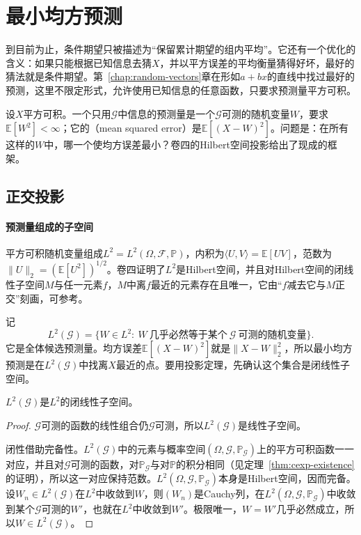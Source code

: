 \section{最小均方预测}
\label{sec:cexp-prediction}

到目前为止，条件期望只被描述为“保留累计期望的组内平均”。它还有一个优化的含义：如果只能根据已知信息去猜$X$，并以平方误差的平均衡量猜得好坏，最好的猜法就是条件期望。第~\ref{chap:random-vectors}章在形如$a+bx$的直线中找过最好的预测，这里不限定形式，允许使用已知信息的任意函数，只要求预测量平方可积。

设$X$平方可积。一个只用$\mathcal{G}$中信息的预测量是一个$\mathcal{G}$可测的随机变量$W$，要求$\mathbb{E}[W^{2}]<\infty$；它的（mean squared error）是$\mathbb{E}[(X-W)^{2}]$。问题是：在所有这样的$W$中，哪一个使均方误差最小？卷四的Hilbert空间投影给出了现成的框架。

\subsection{正交投影}
\label{sec:cexp-projection}

\paragraph{预测量组成的子空间}
平方可积随机变量组成$L^{2}=L^{2}(\Omega,\mathcal{F},\mathbb{P})$，内积为$\langle U,V\rangle=\mathbb{E}[UV]$，范数为$\lVert U\rVert_2=(\mathbb{E}[U^{2}])^{1/2}$。卷四证明了$L^{2}$是Hilbert空间，并且对Hilbert空间的闭线性子空间$M$与任一元素$f$，$M$中离$f$最近的元素存在且唯一，它由“$f$减去它与$M$正交”刻画，可参考。

记
\[
 L^{2}(\mathcal{G})=\bigl\{W\in L^{2}:\ W\ \text{几乎必然等于某个}\ \mathcal{G}\ \text{可测的随机变量}\bigr\}.
\]
它是全体候选预测量。均方误差$\mathbb{E}[(X-W)^{2}]$就是$\lVert X-W\rVert_2^{2}$，所以最小均方预测是在$L^{2}(\mathcal{G})$中找离$X$最近的点。要用投影定理，先确认这个集合是闭线性子空间。

\begin{lemma}[已知信息上的平方可积变量]
\label{lem:cexp-closed-subspace}
$L^{2}(\mathcal{G})$是$L^{2}$的闭线性子空间。
\end{lemma}

\begin{proof}
$\mathcal{G}$可测的函数的线性组合仍$\mathcal{G}$可测，所以$L^{2}(\mathcal{G})$是线性子空间。

闭性借助完备性。$L^{2}(\mathcal{G})$中的元素与概率空间$(\Omega,\mathcal{G},\mathbb{P}_{\mathcal{G}})$上的平方可积函数一一对应，并且对$\mathcal{G}$可测的函数，对$\mathbb{P}_{\mathcal{G}}$与对$\mathbb{P}$的积分相同（见定理~\ref{thm:cexp-existence}的证明），所以这一对应保持范数。$L^{2}(\Omega,\mathcal{G},\mathbb{P}_{\mathcal{G}})$本身是Hilbert空间，因而完备。设$W_n\in L^{2}(\mathcal{G})$在$L^{2}$中收敛到$W$，则$(W_n)$是Cauchy列，在$L^{2}(\Omega,\mathcal{G},\mathbb{P}_{\mathcal{G}})$中收敛到某个$\mathcal{G}$可测的$W'$，也就在$L^{2}$中收敛到$W'$。极限唯一，$W=W'$几乎必然成立，所以$W\in L^{2}(\mathcal{G})$。
\end{proof}

